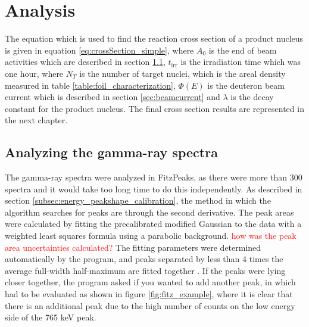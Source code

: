 \chapter{Analysis}\label{chapter:analysis} %

The equation which is used to find the reaction cross section of a product nucleus is given in equation \ref{eq:crossSection_simple}, where $A_0$ is the end of beam activities which are described in section \ref{sec:EOB_A0}, $t_\text{irr}$ is the irradiation time which was one hour, where $N_T$ is the number of target nuclei, which is the areal density measured in table \ref{table:foil_characterization}, $\Phi(E)$ is the deuteron beam current which is described in section \ref{sec:beamcurrent} and $\lambda$ is the decay constant for the product nucleus. The final cross section results are represented in the next chapter. 

\section{Analyzing the gamma-ray spectra} \label{sec:EOB_A0} 
The gamma-ray spectra were analyzed in FitzPeaks, as there were more than 300 spectra and it would take too long time to do this independently. As described in section \ref{subsec:energy_peakshape_calibration}, the method in which the algorithm searches for peaks are through the second derivative. The peak areas were calculated by fitting the precalibrated modified Gaussian to the data with a weighted least squares formula using a parabolic background. \textcolor{red}{how was the peak area uncertainties calculated?} The fitting parameters were determined automatically by the program, and peaks separated by less than 4 times the average full-width half-maximum are fitted together \cite{Koskelo1981}. If the peaks were lying closer together, the program asked if you wanted to add another peak, in which had to be evaluated as shown in figure \ref{fig:fitz_example}, where it is clear that there is an additional peak due to the high number of counts on the low energy side of the 765 keV peak. 

